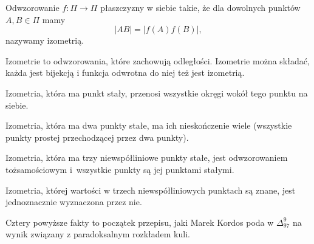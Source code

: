 
\begin{definition}
    Odwzorowanie $f \colon \Pi \to \Pi$ płaszczyzny w siebie takie, że dla dowolnych punktów $A, B \in \Pi$ mamy
    \begin{equation}
        |AB| = |f(A) f(B)|,
    \end{equation}
    nazywamy izometrią.
\end{definition}

Izometrie to odwzorowania, które zachowują odległości.
Izometrie można składać, każda jest bijekcją i funkcja odwrotna do niej też jest izometrią.

\begin{proposition}
\label{delta_1997_9_start}%
    Izometria, która ma punkt stały, przenosi wszystkie okręgi wokół tego punktu na siebie.
\end{proposition}

\begin{proposition}
    Izometria, która ma dwa punkty stałe, ma ich nieskończenie wiele (wszystkie punkty prostej przechodzącej przez dwa punkty).
\end{proposition}

\begin{proposition}
    Izometria, która ma trzy niewspółliniowe punkty stałe, jest odwzorowaniem tożsamościowym i~wszystkie punkty są jej punktami stałymi.
\end{proposition}

\begin{proposition}
\label{delta_1997_9_end}%
    Izometria, której wartości w trzech niewspółliniowych punktach są znane, jest jednoznacznie wyznaczona przez nie.
\end{proposition}

Cztery powyższe fakty to początek przepisu, jaki Marek Kordos poda w $\Delta_{97}^9$ na wynik związany z paradoksalnym rozkładem kuli.